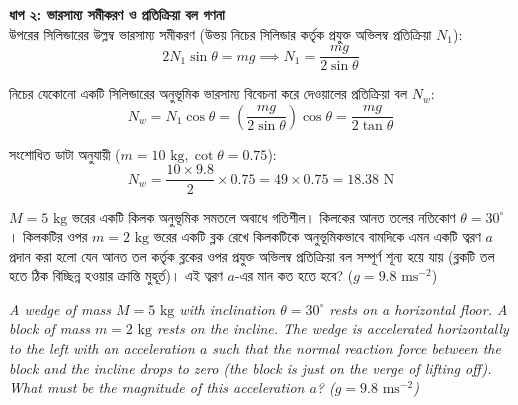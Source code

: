 \documentclass[12pt, a4paper]{article}
\begin{document}
{{\begin{tcolorbox}[solutionbox={সমাধান (Solution)}]
    \vspace{0.5em}
    \noindent\textbf{ধাপ ২: ভারসাম্য সমীকরণ ও প্রতিক্রিয়া বল গণনা} \\
    উপরের সিলিন্ডারের উল্লম্ব ভারসাম্য সমীকরণ (উভয় নিচের সিলিন্ডার কর্তৃক প্রযুক্ত অভিলম্ব প্রতিক্রিয়া $N_1$):
    \[ 2 N_1 \sin\theta = m g \implies N_1 = \frac{m g}{2 \sin\theta} \]
    
    নিচের যেকোনো একটি সিলিন্ডারের অনুভূমিক ভারসাম্য বিবেচনা করে দেওয়ালের প্রতিক্রিয়া বল $N_w$:
    \[ N_w = N_1 \cos\theta = \left(\frac{m g}{2 \sin\theta}\right) \cos\theta = \frac{m g}{2 \tan\theta} \]
    
    সংশোধিত ডাটা অনুযায়ী ($m = 10\text{ kg}, \cot\theta = 0.75$):
    \[ N_w = \frac{10 \times 9.8}{2} \times 0.75 = 49 \times 0.75 = \mathbf{18.38}\text{ N} \]
\end{tcolorbox}

\newpage

\begin{tcolorbox}[questionbox={প্রশ্ন (Question) 44}]
    \noindent
    $M = 5\text{ kg}$ ভরের একটি কিলক অনুভূমিক সমতলে অবাধে গতিশীল। কিলকের আনত তলের নতিকোণ $\theta = 30^\circ$। কিলকটির ওপর $m = 2\text{ kg}$ ভরের একটি ব্লক রেখে কিলকটিকে অনুভূমিকভাবে বামদিকে এমন একটি ত্বরণ $a$ প্রদান করা হলো যেন আনত তল কর্তৃক ব্লকের ওপর প্রযুক্ত অভিলম্ব প্রতিক্রিয়া বল সম্পূর্ণ শূন্য হয়ে যায় (ব্লকটি তল হতে ঠিক বিচ্ছিন্ন হওয়ার ক্রান্তি মুহূর্ত)। এই ত্বরণ $a$-এর মান কত হতে হবে? ($g = 9.8\text{ ms}^{-2}$)
    
    \vspace{0.8em}
    \begin{english}
    \noindent\textit{\color{darkgray}
    A wedge of mass $M = 5\text{ kg}$ with inclination $\theta = 30^\circ$ rests on a horizontal floor. A block of mass $m = 2\text{ kg}$ rests on the incline. The wedge is accelerated horizontally to the left with an acceleration $a$ such that the normal reaction force between the block and the incline drops to zero (the block is just on the verge of lifting off). What must be the magnitude of this acceleration $a$? ($g = 9.8\text{ ms}^{-2}$)
    }
    \end{english}
\end{tcolorbox}

\vspace{1em}
\begin{center}
\end{center}}}
\end{document}
